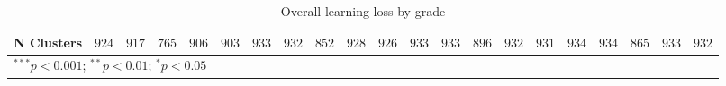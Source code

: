 \begin{table}
\begin{center}
\begin{tabular}{l c c c c c c c c c c c c c c c c c c c c}
N Clusters                   & $924$        & $917$         & $765$        & $906$         & $903$        & $933$        & $932$        & $852$        & $928$        & $926$        & $933$        & $933$        & $896$         & $932$        & $931$        & $934$        & $934$        & $865$        & $933$        & $932$        \\
\hline
\multicolumn{21}{l}{\scriptsize{$^{***}p<0.001$; $^{**}p<0.01$; $^{*}p<0.05$}}
\end{tabular}
\caption{Overall learning loss by grade}
\label{table:grade}
\end{center}
\end{table}
